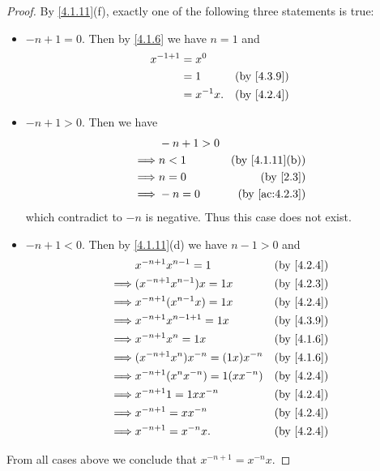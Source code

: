 \begin{proof}
  By \cref{4.1.11}(f), exactly one of the following three statements is true:
  \begin{itemize}
    \item \(-n + 1 = 0\).
          Then by \cref{4.1.6} we have \(n = 1\) and
          \begin{align*}
            x^{-1 + 1} & = x^0                                  \\
                       & = 1         & \text{(by \cref{4.3.9})} \\
                       & = x^{-1} x. & \text{(by \cref{4.2.4})}
          \end{align*}
    \item \(-n + 1 > 0\).
          Then we have
          \begin{align*}
                     & -n + 1 > 0                                \\
            \implies & n < 1      & \text{(by \cref{4.1.11}(b))} \\
            \implies & n = 0      & \text{(by \cref{2.3})}       \\
            \implies & -n = 0     & \text{(by \cref{ac:4.2.3})}
          \end{align*}
          which contradict to \(-n\) is negative.
          Thus this case does not exist.
    \item \(-n + 1 < 0\).
          Then by \cref{4.1.11}(d) we have \(n - 1 > 0\) and
          \begin{align*}
                     & x^{-n + 1} x^{n - 1} = 1              & \text{(by \cref{4.2.4})} \\
            \implies & (x^{-n + 1} x^{n - 1}) x = 1x         & \text{(by \cref{4.2.3})} \\
            \implies & x^{-n + 1} (x^{n - 1} x) = 1x         & \text{(by \cref{4.2.4})} \\
            \implies & x^{-n + 1} x^{n - 1 + 1} = 1x         & \text{(by \cref{4.3.9})} \\
            \implies & x^{-n + 1} x^n = 1x                   & \text{(by \cref{4.1.6})} \\
            \implies & (x^{-n + 1} x^n) x^{-n} = (1x) x^{-n} & \text{(by \cref{4.1.6})} \\
            \implies & x^{-n + 1} (x^n x^{-n}) = 1(x x^{-n}) & \text{(by \cref{4.2.4})} \\
            \implies & x^{-n + 1} 1 = 1x x^{-n}              & \text{(by \cref{4.2.4})} \\
            \implies & x^{-n + 1} = x x^{-n}                 & \text{(by \cref{4.2.4})} \\
            \implies & x^{-n + 1} = x^{-n} x.                & \text{(by \cref{4.2.4})}
          \end{align*}
  \end{itemize}
  From all cases above we conclude that \(x^{-n + 1} = x^{-n} x\).
\end{proof}

